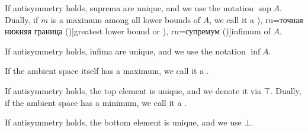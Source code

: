 \begin{definition}
\begin{thmenum}
\begin{TwoColumns*}
      If antisymmetry holds, suprema are unique, and we use the notation \( \sup A \).
    \BeginSecondColumn
      Dually, if \( m \) is a maximum among all lower bounds of \( A \), we call it a \term[bg=точна долна граница (\cite[19]{Тагамлицки1971Диф}), ru=точная нижняя граница (\cite[]{Ляпин1960})]{greatest lower bound} or \term[bg=инфимум (\cite[10]{Проданов1982}), ru=супремум (\cite[]{Ляпин1960})]{infimum} of \( A \).

      If antisymmetry holds, infima are unique, and we use the notation \( \inf A \).
    \end{TwoColumns*}

    \begin{TwoColumns*}
      If the ambient space itself has a maximum, we call it a .

      If antisymmetry holds, the top element is unique, and we denote it via \( \top \).
    \BeginSecondColumn
      Dually, if the ambient space has a minimum, we call it a .

      If antisymmetry holds, the bottom element is unique, and we use \( \bot \).
    \end{TwoColumns*}
  \end{thmenum}
\end{definition}

